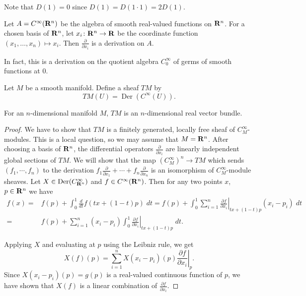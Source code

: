 \documentclass[a4paper,openany]{scrbook}
\DeclareMathOperator{\Der}{Der}
\begin{document}
Note that $D(1)=0$ since $D(1) = D(1\cdot 1)=2D(1)$.

\begin{example}
Let $A=C^\infty(\mathbf R^n)$ be the algebra of smooth real-valued functions on $\mathbf R^n$. For a chosen basis of $\mathbf R^n$, let $x_i\colon \mathbf R^n \to \mathbf R$ be the coordinate function $(x_1,\dots,x_n) \mapsto x_i$. Then $\frac\partial{\partial x_i}$ is a derivation on $A$.

In fact, this is a derivation on the quotient algebra $C^\infty_0$ of germs of smooth functions at $0$.
\end{example}

\begin{defn}
Let $M$ be a smooth manifold. Define a sheaf $TM$ by
\[
TM(U) = \Der(C^{\infty}(U)).
\]
\end{defn}

\begin{thm} \label{thm:tangentspacebundle}
For an $n$-dimensional manifold $M$, $TM$ is an $n$-dimensional real vector bundle.
\end{thm}
\begin{proof}
We have to show that $TM$ is a finitely generated, locally free sheaf of $C^\infty_M$-modules. This is a local question, so we may assume that $M = \mathbf R^n$. After choosing a basis of $\mathbf R^n$, the differential operators $\frac\partial{\partial x_i}$ are linearly independent global sections of $TM$. We will show that the map $(C^\infty_M)^n \to TM$ which sends $(f_1,\cdots,f_n)$ to the derivation $f_1\frac\partial{\partial x_1}+\cdots+f_n\frac\partial{\partial x_n}$ is an isomorphism of $C^\infty_M$-module sheaves. Let $X \in \Der(C^\infty_{\R^n})$ and $f \in C^\infty(\mathbf R^n)$. Then for any two points $x$, $p \in \mathbf R^n$ we have
\begin{align*}
f(x) = & f(p)+\int_0^1 \frac d {dt} f(tx+(1-t)p)\; dt = f(p) + \int_0^1 \sum_{i=1}^n\left.\frac{\partial f}{\partial x_i}\right|_{tx+(1-t)p} (x_i-p_i)\; dt \\
= & f(p) + \sum_{i=1}^n (x_i-p_i) \int_0^1 \left.\frac{\partial f}{\partial x_i}\right|_{tx+(1-t)p}\; dt.
\end{align*}

Applying $X$ and evaluating at $p$ using the Leibniz rule, we get
\[
X(f)(p) = \sum_{i=1}^n X(x_i-p_i)(p) \left.\frac{\partial f}{\partial x_i}\right|_p.
\]
Since $X(x_i-p_i)(p) = g(p)$ is a real-valued continuous function of $p$, we have shown that $X(f)$ is a linear combination of $\frac{\partial f}{\partial x_i}$.
\end{proof}
\end{document}

